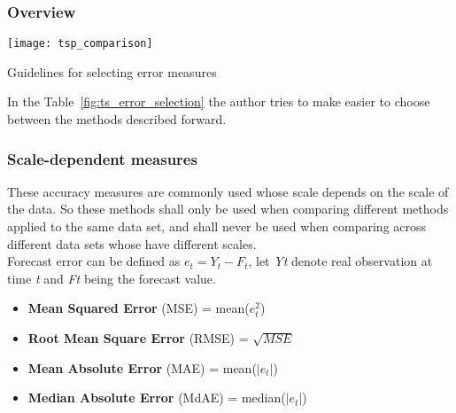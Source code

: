 \subsubsection{Overview}
\begin{table}[h] \begin{center} \leavevmode
\texttt{[image: tsp\_comparison]} \caption{Guidelines for
selecting error measures \cite{Armstrong199269} } \label{fig:ts_error_selection}
\end{center} \end{table}

In the Table~\ref{fig:ts_error_selection} the author tries to make easier to
choose between the methods described forward.

\subsubsection{Scale-dependent measures}

These accuracy measures are commonly used whose scale depends on the scale of
the data. So these methods shall only be used when comparing different methods
applied to the same data set, and shall never be used when comparing across
different data sets whose have different scales.
\\

Forecast error can be defined as \begin{math} e_t = Y_t - F_t \end{math}, let
\emph{Yt} denote real observation at time \emph{t} and \emph{Ft} being the
forecast value.
\begin{itemize}
  \item \textbf{Mean Squared Error} (MSE) = mean(\begin{math} e_t^2 \end{math})
    \item \textbf{Root Mean Square Error} (RMSE) = \begin{math}
      \sqrt{MSE}\end{math}
  \item \textbf{Mean Absolute Error} (MAE) = mean(\begin{math}
      \left|e_t\right|\end{math})
  \item \textbf{Median Absolute Error} (MdAE) = median(\begin{math}
      \left|e_t\right|\end{math})

\end{itemize}

